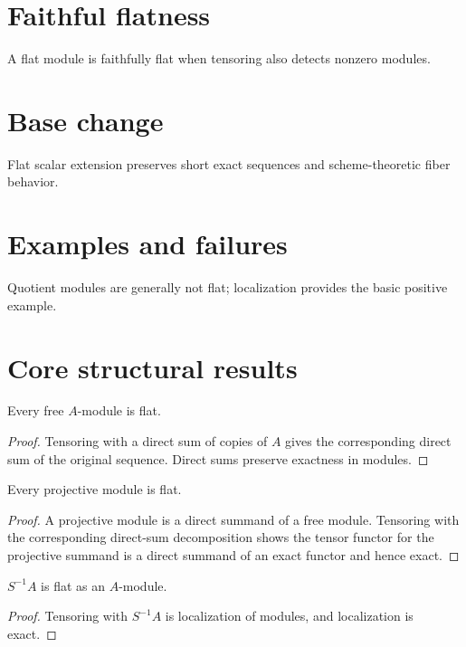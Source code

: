 \section{Faithful flatness}
A flat module is faithfully flat when tensoring also detects nonzero modules.

\section{Base change}
Flat scalar extension preserves short exact sequences and scheme-theoretic fiber behavior.

\section{Examples and failures}
Quotient modules are generally not flat; localization provides the basic positive example.

\section{Core structural results}

\begin{theorem}\label{thm:v14-01}
Every free $A$-module is flat.
\begin{proof}
Tensoring with a direct sum of copies of $A$ gives the corresponding direct sum of the original sequence. Direct sums preserve exactness in modules.
\end{proof}
\end{theorem}

\begin{theorem}\label{thm:v14-02}
Every projective module is flat.
\begin{proof}
A projective module is a direct summand of a free module. Tensoring with the corresponding direct-sum decomposition shows the tensor functor for the projective summand is a direct summand of an exact functor and hence exact.
\end{proof}
\end{theorem}

\begin{theorem}\label{thm:v14-03}
$S^{-1}A$ is flat as an $A$-module.
\begin{proof}
Tensoring with $S^{-1}A$ is localization of modules, and localization is exact.
\end{proof}
\end{theorem}


